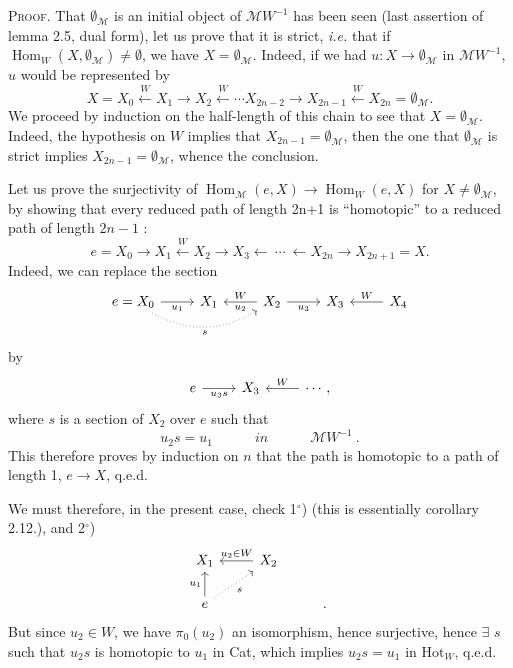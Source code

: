 \documentclass[11pt]{article}
\newcommand{\printedpage}[1]{\marginpar{\footnotesize p.~#1}}
\newcommand{\msp}[1]{\marginpar{\footnotesize [#1]}}
\newcommand{\Hom}{\operatorname{Hom}}
\newcommand{\Hot}{\mathrm{Hot}}
\begin{document}
\textsc{Proof}. That $\emptyset_{\mathcal{M}}$ is an initial object of $\mathcal{M}W^{-1}$ has been seen (last assertion of lemma 2.5, dual form), let us prove that it is strict, \textit{i.e.} that if $\Hom_W(X,\emptyset_{\mathcal{M}})\neq\emptyset$, we have $X=\emptyset_{\mathcal{M}}$. Indeed, if we had $u : X\longrightarrow\emptyset_{\mathcal{M}}$ in $\mathcal{M}W^{-1}$, $u$ would be represented by
\[
X=X_0\xleftarrow{\ W\ }X_1\longrightarrow X_2\xleftarrow{\ W\ }\cdots X_{2n-2}\longrightarrow X_{2n-1}\xleftarrow{\ W\ }X_{2n}=\emptyset_{\mathcal{M}}.
\]
We proceed by induction on the half-length of this chain to see that $X=\emptyset_{\mathcal{M}}$. Indeed, the hypothesis on $W$ implies that $X_{2n-1}=\emptyset_{\mathcal{M}}$, then the one that $\emptyset_{\mathcal{M}}$ is strict implies
$X_{2n-1}=\emptyset_{\mathcal{M}}$, whence the conclusion. %

\msp{page 14'}
Let us prove the surjectivity of $\Hom_{\mathcal{M}}(e,X)\longrightarrow\Hom_W(e,X)$ for $X\neq\emptyset_{\mathcal{M}}$, by showing that every reduced path of length 2n+1 is ``homotopic'' to a reduced path of length $2n-1$ :
\[
e=X_0\longrightarrow X_1\xleftarrow{\ W\ }X_2\longrightarrow X_3\longleftarrow\ \cdots\ \longleftarrow X_{2n}\longrightarrow X_{2n+1}=X.
\]
Indeed, we can replace the section
\[
\begin{tikzcd}
e=X_0 \arrow[r,"u_1"'] \arrow[rr,dotted,bend right,"s"'] & X_1 & X_2 \arrow[l,"W"',"u_2"] \arrow[r,"u_3"'] & X_3 & X_4 \arrow[l,"W"']
\end{tikzcd}
\]
\printedpage{11}
by
\[
\begin{tikzcd}
e \arrow[r,"u_3s"'] & X_3 & \cdots, \arrow[l,"W"']
\end{tikzcd}
\]
where $s$ is a section of $X_2$ over $e$ such that
\[
u_2s=u_1\qquad\quad\textit{in}\qquad\quad\mathcal{M}W^{-1}\ .
\]
This therefore proves by induction on $n$ that the path is homotopic to a path of length 1, $e\longrightarrow X$, q.e.d.

We must therefore, in the present case, check 1$^{\circ}$) (this is essentially corollary 2.12.), and 2$^{\circ}$)
\[
\begin{tikzcd}
X_1 & X_2 \arrow[l,"u_2\in W"'] & \\
e \arrow[u,"u_1"] \arrow[ur,dotted,"s"'] & & .
\end{tikzcd}
\]
But since $u_2\in W$, we have $\pi_0(u_2)$ an isomorphism, hence
\msp{page 15'}
surjective, hence $\exists$ $s$ such that $u_2s$ is homotopic to $u_1$ in Cat, which implies $u_2s=u_1$ in $\Hot_W$, q.e.d.
\end{document}
